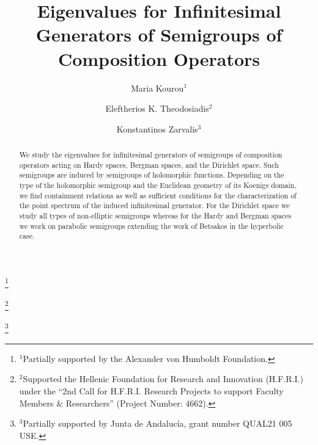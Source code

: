 \documentclass[11pt]{amsart}
\numberwithin{equation}{section}
\theoremstyle{definition}
\begin{document}
	
	\title[Eigenvalues for Infinitesimal Generators]{Eigenvalues for Infinitesimal Generators of Semigroups of Composition Operators}
	
	\author{Maria Kourou$^1$}
	\thanks{$^1$Partially supported by the Alexander von Humboldt Foundation.}  
	\address{Department of Mathematics, Julius-Maximilians University of W\"urzburg, 97074, W\"urzburg, Germany}
	
	\author{Eleftherios K. Theodosiadis$^2$}
	\thanks{$^2$Supported the Hellenic Foundation for Research and Innovation (H.F.R.I.) under the ``2nd Call for H.F.R.I. Research Projects to support Faculty Members \& Researchers'' (Project Number: 4662).}
	\address{Department of Mathematics, Aristotle University of Thessaloniki, 54124, Thessaloniki, Greece}
	
	
	\author{Konstantinos Zarvalis$^3$}
	\thanks{$^3$Partially supported by Junta de Andaluc\'{i}a, grant number QUAL21 005 USE.}
	\address{Department of Mathematics, Aristotle University of Thessaloniki, 54124, Thessaloniki, Greece}
	
	
	\fancyhf{}
	\renewcommand{\headrulewidth}{0.2pt}
	\fancyhead[RO,LE]{\small \thepage}
	
	\fancyfoot[L,R,C]{}
	
	\date{}
	
	
	\begin{abstract}
		We study the eigenvalues for infinitesimal generators of semigroups of composition operators acting on Hardy spaces, Bergman spaces, and the Dirichlet space. Such semigroups are induced by semigroups of holomorphic functions. Depending on the type of the holomorphic semigroup and the Euclidean geometry of its Koenigs domain, we find containment relations as well as sufficient conditions for the characterization of the point spectrum of the induced infinitesimal generator. For the Dirichlet space we study all types of non-elliptic semigroups whereas for the Hardy and Bergman spaces we work on parabolic semigroups extending the work of Betsakos in the hyperbolic case.
	\end{abstract}
	
\end{document}
